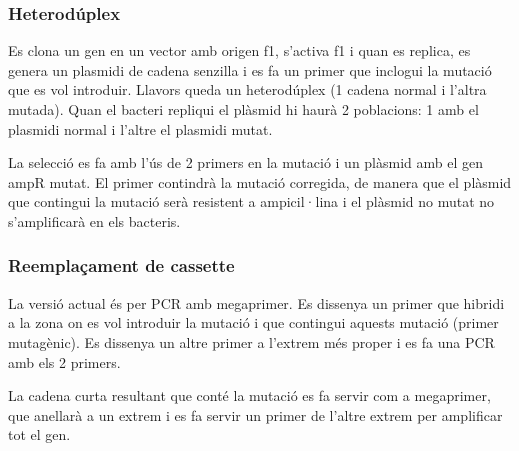 \subsubsection{Heterodúplex}
\label{sec:heteroduplex}
Es clona un gen en un vector amb origen f1, s'activa f1 i quan es
replica, es genera un plasmidi de cadena senzilla i es fa un primer
que inclogui la mutació que es vol introduir.  Llavors queda un
heterodúplex (1 cadena normal i l'altra mutada). Quan el bacteri
repliqui el plàsmid hi haurà 2 poblacions: 1 amb el plasmidi normal i
l'altre el plasmidi mutat.

La selecció es fa amb l'ús de 2 primers en la mutació i un plàsmid amb
el gen ampR mutat. El primer contindrà la mutació corregida, de manera
que el plàsmid que contingui la mutació serà resistent a ampicil·lina
i el plàsmid no mutat no s'amplificarà en els bacteris.

\subsubsection{Reemplaçament de cassette}
\label{sec:reempl-de-cass}

La versió actual és per PCR amb megaprimer. Es dissenya un primer que
hibridi a la zona on es vol introduir la mutació i que contingui
aquests mutació (primer mutagènic). Es dissenya un altre primer a
l'extrem més proper i es fa una PCR amb els 2 primers.

La cadena curta resultant que conté la mutació es fa servir com a
megaprimer, que anellarà a un extrem i es fa servir un primer de
l'altre extrem per amplificar tot el gen.
